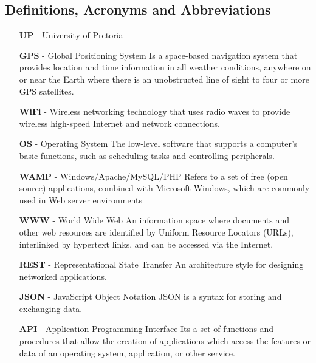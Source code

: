 \documentclass[12pt,a4paper]{article}
\begin{document}
		\subsection{Definitions, Acronyms and Abbreviations}
			\begin{itemize}
				\item [\textbf{UP}] - University of Pretoria
				
				\item [\textbf{GPS}] - Global Positioning System \newline
				 Is a space-based navigation system that provides location and time information 
				 in all weather conditions, anywhere on or near the Earth where there is an 
				 unobstructed line of sight to four or more GPS satellites.
				 
				\item [\textbf{WiFi}] - \newline
				Wireless networking technology that uses radio waves to provide wireless 
				high-speed Internet and network connections.
				
				\item [\textbf{OS}] - Operating System \newline
				The low-level software that supports a computer's basic functions, such as 
				scheduling tasks and controlling peripherals.
				
				\item [\textbf{WAMP}] - Windows/Apache/MySQL/PHP \newline
				Refers to a set of free (open source) applications, combined with Microsoft 
				Windows, which are commonly used in Web server environments
				
				\item [\textbf{WWW}] - World Wide Web \newline
				An information space where documents and other web resources are identified 
				by Uniform Resource Locators (URLs), interlinked by hypertext links, and can 
				be accessed via the Internet.
				
				\item [\textbf{REST}] - Representational State Transfer \newline
				An architecture style for designing networked applications.
				
				\item [\textbf{JSON}] - JavaScript Object Notation \newline
				JSON is a syntax for storing and exchanging data.
				
				\item [\textbf{API}] - Application Programming Interface \newline
				Its a set of functions and procedures that allow the creation of applications 
				which access the features or data of an operating system, application, or other 
				service.
				
			\end{itemize}
\end{document}
